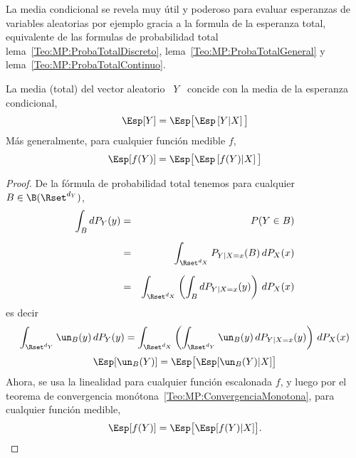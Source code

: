 La media condicional se revela muy  \'util y poderoso para evaluar esperanzas de
variables  aleatorias por ejemplo  gracia a  la formula  de la  esperanza total,
equivalente      de      las       formulas      de      probabilidad      total
lema~\ref{Teo:MP:ProbaTotalDiscreto},    lema~\ref{Teo:MP:ProbaTotalGeneral}   y
lema~\ref{Teo:MP:ProbaTotalContinuo}.
%
\begin{teorema}\label{Teo:MP:EsperanzaTotal}
%
  La media  (total) del  vector aleatorio  \ $Y$ \  concide con  la media  de la
  esperanza condicional, \ie
  \[
  \Esp[Y] = \Esp\big[ \Esp\left[ Y | X\right] \big]
  \]
  M\'as generalmente, para cualquier funci\'on medible $f$,
  \[
  \Esp[f(Y)] = \Esp\big[ \Esp\left[ f(Y) | X\right] \big]
  \]
\end{teorema}
%
\begin{proof}
  De  la  f\'ormula  de probabilidad  total  tenemos  para  cualquier \  $B  \in
  \B(\Rset^{d_Y})$,
  \begin{eqnarray*}
  \int_B dP_Y(y) & = & P(Y \in B)\\[2mm]
  & = & \int_{\Rset^{d_X}} P_{Y|X=x}(B) \, dP_X(x)\\[2mm]
  & = & \int_{\Rset^{d_X}} \left( \int_B dP_{Y|X=x}(y) \right) \, dP_X(x)
  \end{eqnarray*}
  es decir
  \[
  \int_{\Rset^{d_Y}}   \un_B(y)   \,   dP_Y(y)   =   \int_{\Rset^{d_X}}   \left(
    \int_{\Rset^{d_Y}} \un_B(y) \, dP_{Y|X=x}(y) \right) \, dP_X(x)
  \]
  \ie
  \[
  \Esp[ \un_B(Y) ] = \Esp\big[ \Esp[ \un_B(Y) | X ] \big]
  \]
  Ahora, se usa  la linealidad para cualquier funci\'on  escalonada $f$, y luego
  por  el teorema de  convergencia mon\'otona~\ref{Teo:MP:ConvergenciaMonotona},
  para cualquier funci\'on medible,
  \[
  \Esp[ f(Y) ] = \Esp\big[ \Esp[ f(Y) | X ] \big].
  \]
\end{proof}

